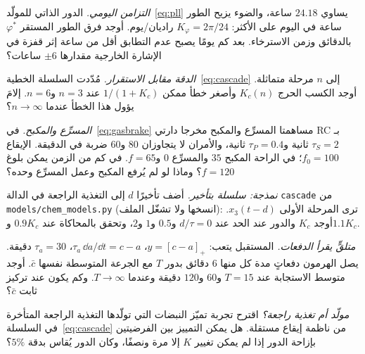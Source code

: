 \begin{exercise}[\lvlA]
\label{ex:16:2}
\emph{التزامن اليومي.} الدور الذاتي للمولّد~\eqref{eq:pll} يساوي $24.18$ ساعة، والضوء يزيح الطور ساعة في اليوم على الأكثر: $K_\varphi=2\pi/24$ راديان/يوم. أوجد فرق الطور المستقر $\varphi^*$ بالدقائق وزمن الاسترخاء. بعد كم يومًا يصبح عدم التطابق أقل من ساعة إثر قفزة في الإشارة الخارجية مقدارها $\pm6$ ساعات؟
\end{exercise}

\begin{exercise}[\lvlB]
\label{ex:16:3}
\emph{الدقة مقابل الاستقرار.} مُدّدت السلسلة الخطية~\eqref{eq:cascade} إلى $n$ مرحلة متماثلة. أوجد الكسب الحرج $K_c(n)$ وأصغر خطأ ممكن $1/(1+K_c)$ عند $n=3$ و$n=6$. إلامَ يؤول هذا الخطأ عندما $n\to\infty$؟
\end{exercise}

\begin{exercise}[\lvlB]
\label{ex:16:4}
\emph{المسرِّع والمكبح.} في~\eqref{eq:gasbrake} مساهمتا المسرِّع والمكبح مخرجا دارتي RC بـ$\tau_S=2$ ثانية و$\tau_P=0.4$ ثانية، والأمران لا يتجاوزان $80$ و$60$ ضربة في الدقيقة. الإيقاع $f_0=100$؛ في الراحة المكبح $35$ والمسرِّع $0$ و$f=65$. في كم من الزمن يمكن بلوغ $f=120$؟ وماذا لو لم يُرفع المكبح وعمل المسرِّع وحده؟
\end{exercise}

\begin{exercise}[\lvlB]
\label{ex:16:5}
\emph{نمذجة: سلسلة بتأخير.} أضف تأخيرًا $d$ إلى التغذية الراجعة في الدالة \texttt{cascade} من \texttt{models/\allowbreak chem\_models.py} (انسخها ولا تشغّل الملف): ترى المرحلة الأولى $x_3(t-d)$. أوجد $K_c$ والدور عند الحد عند $d/\tau=0$ و$0.5$ و$1$ و$2$، وتحقق بالمحاكاة عند $0.9K_c$ و$1.1K_c$.
\end{exercise}

\begin{exercise}[\lvlB]
\label{ex:16:6}
\emph{متلقٍّ يقرأ الدفعات.} المستقبل يتعب: $y=[c-a]_+$، $\tau_a\,\dd a/\dd t=c-a$، $\tau_a=30$ دقيقة. يصل الهرمون دفعاتٍ مدة كل منها $6$ دقائق بدور $T$ مع الجرعة المتوسطة نفسها $\bar c$. أوجد متوسط الاستجابة عند $T=15$ و$60$ و$120$ دقيقة وعندما $T\to\infty$. وكم يكون عند تركيز ثابت $\bar c$؟
\end{exercise}

\begin{exercise}[\lvlC]
\label{ex:16:7}
\emph{مولّد أم تغذية راجعة؟} اقترح تجربة تميّز النبضات التي تولّدها التغذية الراجعة المتأخرة في السلسلة~\eqref{eq:cascade} من ناظمة إيقاع مستقلة. هل يمكن التمييز بين الفرضيتين بإزاحة الدور إذا لم يمكن تغيير $K$ إلا مرة ونصفًا، وكان الدور يُقاس بدقة $5\%$؟
\end{exercise}

